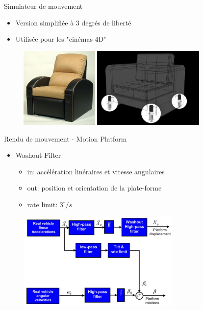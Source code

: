 \documentclass[compress, noflama]{beamer}
\begin{document}
{
\begin{frame}{Simulateur de mouvement}
\begin{itemize}
\item Version simplifiée à 3 degrés de liberté
\item Utilisée pour les "cinémas 4D"
\end{itemize}
\begin{figure}
\centering
\includegraphics[height=4cm]{images/dbox1}
\includegraphics[height=4cm]{images/dbox}
\end{figure}
\end{frame}
}

{
\begin{frame}{Rendu de mouvement - Motion Platform}
\begin{itemize}
\item Washout Filter
\begin{itemize}
\item in: accélération linéraires et vitesse angulaires
\item out: position et orientation de la plate-forme
\item rate limit: $3^\circ/s$
\end{itemize}
\end{itemize}
\begin{figure}
\centering
\includegraphics[width=8cm]{images/washout_filter}
\end{figure}
\end{frame}
}
\end{document}
